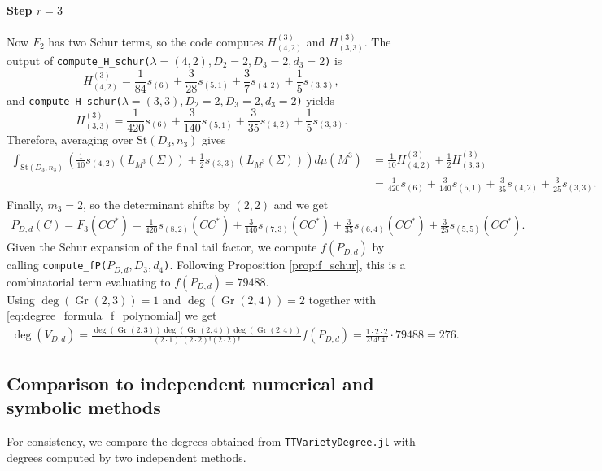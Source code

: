 \documentclass{article}
\theoremstyle{definition}
\newcommand{\St}{\mathrm{St}}
\begin{document}
\paragraph{Step $r=3$}
Now \(F_2\) has two Schur terms, so the code computes $H_{(4,2)}^{(3)}$ and $H_{(3,3)}^{(3)}$. The output of  \texttt{compute\_H\_schur($\lambda=(4,2), D_2=2, D_3=2, d_3=2$)} is
\[
H_{(4,2)}^{(3)}
=
\frac{1}{84}s_{(6)}
+
\frac{3}{28}s_{(5,1)}
+
\frac{3}{7}s_{(4,2)}
+
\frac{1}{5}s_{(3,3)},
\]
and \texttt{compute\_H\_schur($\lambda=(3,3), D_2=2, D_3=2, d_3=2$)} yields
\[
H_{(3,3)}^{(3)}
=
\frac{1}{420}s_{(6)}
+
\frac{3}{140}s_{(5,1)}
+
\frac{3}{35}s_{(4,2)}
+
\frac{1}{5}s_{(3,3)}.
\]
Therefore, averaging over $\St(D_3, n_3)$ gives
\begin{align*}
    \int_{\St(D_3, n_3)}\left(\frac{1}{10}s_{(4,2)}(L_{M^3}(\Sigma))
+
\frac{1}{2}s_{(3,3)}(L_{M^3}(\Sigma))\right)d\mu(M^3)
&=
\frac{1}{10}H_{(4,2)}^{(3)}
+
\frac{1}{2}H_{(3,3)}^{(3)} \\
&=
\frac{1}{420}s_{(6)}
+
\frac{3}{140}s_{(5,1)}
+
\frac{3}{35}s_{(4,2)}
+
\frac{3}{25}s_{(3,3)}.
\end{align*}
Finally, \(m_3=2\), so the determinant shifts  by \((2,2)\) and we get
\begin{align*}
    P_{D,d}(C)
=
F_3(CC^*) =
\frac{1}{420}s_{(8,2)}(CC^*)
+
\frac{3}{140}s_{(7,3)}(CC^*)
+
\frac{3}{35}s_{(6,4)}(CC^*)
+
\frac{3}{25}s_{(5,5)}(CC^*).
\end{align*}
Given the Schur expansion of the final tail factor, we compute $f(P_{D,d})$ by calling \texttt{compute\_fP($P_{D,d}, D_3, d_4$)}. Following Proposition \ref{prop:f_schur}, this is a combinatorial term evaluating to $f(P_{D,d})=79488$.
\\
Using $\deg(\operatorname{Gr}(2,3))=1$ and $\deg(\operatorname{Gr}(2,4))=2$ together with \eqref{eq:degree_formula_f_polynomial} we get
\begin{align*}
    \deg(V_{D,d}) = \frac{
\deg(\operatorname{Gr}(2,3))
\deg(\operatorname{Gr}(2,4))
\deg(\operatorname{Gr}(2,4))
}{
(2\cdot 1)!(2\cdot 2)!(2\cdot 2)!
}f(P_{D,d}) 
=
\frac{1\cdot 2\cdot 2}{2!\,4!\,4!}\cdot79488 = 276.
\end{align*}

\subsection{Comparison to independent numerical and symbolic methods}

For consistency, we compare the degrees obtained from \texttt{TTVarietyDegree.jl}
with degrees computed by two independent methods. 
\\
\end{document}
